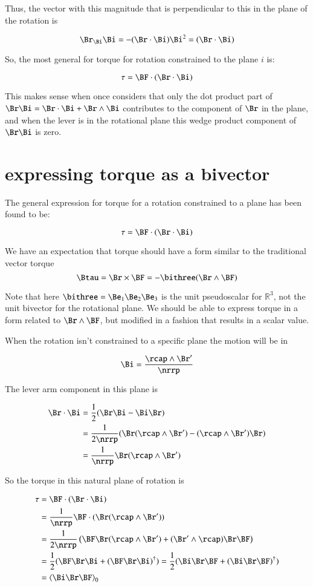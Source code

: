 Thus, the vector with this magnitude that is perpendicular to this in the plane of the rotation  is

\[
\Br _{\Bi } \Bi  
=  -(\Br  \cdot \Bi ) \Bi ^2
=  (\Br  \cdot \Bi ) 
\]

So, the most general for torque for rotation constrained to the plane $i$ is:

\[
\tau
=  \BF  \cdot (\Br  \cdot \Bi ) 
\]

This makes sense when once considers that only the dot product part of $\Br  \Bi  = \Br  \cdot \Bi  + \Br  \wedge \Bi $ contributes to the component of $\Br $ in the plane, and when the lever is in the rotational plane this wedge product component of 
$\Br \Bi $ is zero.

\section{expressing torque as a bivector}

The general expression for torque for a rotation constrained to a plane has been found to be:

\[
\tau
=  \BF  \cdot (\Br  \cdot \Bi ) 
\]

We have an expectation that torque should have a form similar to the traditional vector torque
\[
\Btau = \Br \times \BF = -\bithree (\Br \wedge \BF)
\]

Note that here $\bithree = \Be_1 \Be_2 \Be_3 $ is the unit pseudoscalar for $\mathbb{R}^3$, not the unit bivector for the rotational plane.
We should be able to express torque in a form related to $\Br \wedge \BF$, but modified
in a fashion that results in a scalar value.

When the rotation isn't constrained to a specific plane the motion will be in

\[
\Bi = \frac{\rcap \wedge \Br'}{\nrrp}
\]

The lever arm component in this plane is

\begin{align*}
\Br \cdot \Bi
   &= \frac{1}{2}           (\Br \Bi - \Bi \Br) \\
   &= \frac{1}{2\nrrp} (\Br (\rcap \wedge \Br') - (\rcap \wedge \Br') \Br) \\
   &= \frac{1}{\nrrp}   \Br (\rcap \wedge \Br') \\
\end{align*}

So the torque in this natural plane of rotation is

\begin{align*}
\tau 
   &=  \BF  \cdot (\Br  \cdot \Bi )  \\
   &=  \frac{1}{\nrrp}     \BF \cdot ( \Br (\rcap \wedge \Br') ) \\
   &=  \frac{1}{2 \nrrp} \left(    \BF \Br (\rcap \wedge \Br') + (\Br' \wedge \rcap) \Br \BF    \right)\\
   &=  \frac{1}{2} ( \BF \Br \Bi + (\BF \Br \Bi)^\dagger ) = \frac{1}{2} ( \Bi \Br \BF + (\Bi \Br \BF)^\dagger ) \\
   &=  {\langle \Bi \Br \BF \rangle}_0
\end{align*}

